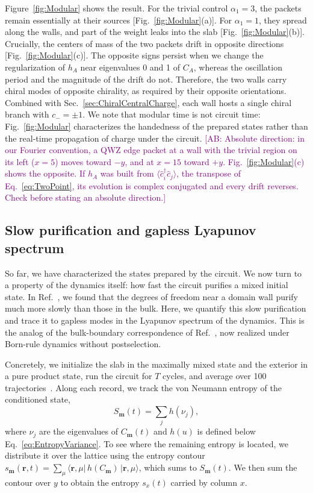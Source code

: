 \documentclass[aps,prb,twocolumn,superscriptaddress,longbibliography,floatfix]{revtex4-2}
\newcommand{\bs}[1]{\boldsymbol{#1}}
\newcommand{\bfr}{\boldsymbol r}
\newcommand{\rec}{\bs m}   %
\newcommand{\abcom}[1]{\textcolor{purple}{[AB: #1]}}
\begin{document}
Figure~\ref{fig:Modular} shows the result. For the trivial control $\alpha_1=3$, the packets remain essentially at their sources [Fig.~\ref{fig:Modular}(a)]. For $\alpha_1=1$, they spread along the walls, and part of the weight leaks into the slab [Fig.~\ref{fig:Modular}(b)]. Crucially, the centers of mass of the two packets drift in opposite directions [Fig.~\ref{fig:Modular}(c)]. The opposite signs persist when we change the regularization of $h_A$ near eigenvalues 0 and 1 of $C_A$, whereas the oscillation period and the magnitude of the drift do not. Therefore, the two walls carry chiral modes of opposite chirality, as required by their opposite orientations. Combined with Sec.~\ref{sec:ChiralCentralCharge}, each wall hosts a single chiral branch with $c_-=\pm1$. We note that modular time is not circuit time: Fig.~\ref{fig:Modular} characterizes the handedness of the prepared states rather than the real-time propagation of charge under the circuit.
\abcom{Absolute direction: in our Fourier convention, a QWZ edge packet at a wall with the trivial region on its left ($x=5$) moves toward $-y$, and at $x=15$ toward $+y$. Fig.~\ref{fig:Modular}(c) shows the opposite. If $h_A$ was built from $\langle\hat c_i^\dagger\hat c_j\rangle$, the transpose of Eq.~\eqref{eq:TwoPoint}, its evolution is complex conjugated and every drift reverses. Check before stating an absolute direction.}

\subsection{Slow purification and gapless Lyapunov spectrum}
\label{sec:Purification}

So far, we have characterized the states prepared by the circuit. We now turn to a property of the dynamics itself: how fast the circuit purifies a mixed initial state. In Ref.~\cite{BhuiyanPanJian2026}, we found that the degrees of freedom near a domain wall purify much more slowly than those in the bulk. Here, we quantify this slow purification and trace it to gapless modes in the Lyapunov spectrum of the dynamics. This is the analog of the bulk-boundary correspondence of Ref.~\cite{XiaoKawabata2026}, now realized under Born-rule dynamics without postselection.

Concretely, we initialize the slab in the maximally mixed state and the exterior in a pure product state, run the circuit for $T$ cycles, and average over 100 trajectories~\cite{GullansHuse2020}. Along each record, we track the von Neumann entropy of the conditioned state,
\begin{equation}
    S_{\rec}(t)=\sum_jh(\nu_j),
    \label{eq:BinaryEntropy}
\end{equation}
where $\nu_j$ are the eigenvalues of $C_{\rec}(t)$ and $h(u)$ is defined below Eq.~\eqref{eq:EntropyVariance}. To see where the remaining entropy is located, we distribute it over the lattice using the entropy contour $s_{\rec}(\bfr,t)=\sum_\mu\langle\bfr,\mu|\,h(C_{\rec})\,|\bfr,\mu\rangle$, which sums to $S_{\rec}(t)$. We then sum the contour over $y$ to obtain the entropy $s_x(t)$ carried by column $x$.
\end{document}
